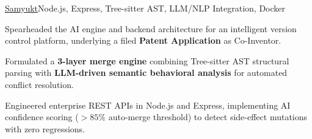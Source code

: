 \begin{cvproject}{\uline{Samyukt}}{Node.js, Express, Tree-sitter AST, LLM/NLP Integration, Docker}
    \item Spearheaded the AI engine and backend architecture for an intelligent version control platform, underlying a filed \textbf{Patent Application} as Co-Inventor.
    \item Formulated a \textbf{3-layer merge engine} combining Tree-sitter AST structural parsing with \textbf{LLM-driven semantic behavioral analysis} for automated conflict resolution.
    \item Engineered enterprise REST APIs in Node.js and Express, implementing AI confidence scoring ($>85\%$ auto-merge threshold) to detect side-effect mutations with zero regressions.
\end{cvproject}
